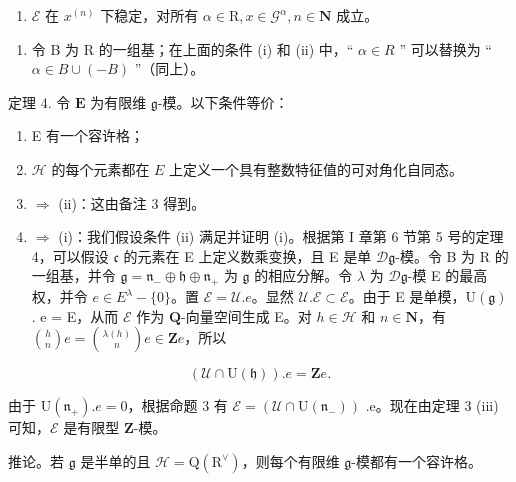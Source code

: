 \begin{enumerate}
\def\labelenumi{(\roman{enumi})}
\setcounter{enumi}{2}
\tightlist
\item
  \(\mathcal{E}\) 在 \(x^{(n)}\) 下稳定，对所有 \(\alpha \in \mathrm{R}, x \in \mathcal{G}^{\alpha}, n \in \mathbf{N}\) 成立。
\end{enumerate}

\begin{enumerate}
\def\labelenumi{\arabic{enumi})}
\setcounter{enumi}{4}
\tightlist
\item
  令 B 为 R 的一组基；在上面的条件 (i) 和 (ii) 中，`` \(\alpha \in R\) '' 可以替换为 `` \(\alpha \in B \cup (-B)\) ''（同上）。
\end{enumerate}

定理 4. 令 \(\mathbf{E}\) 为有限维 \(\mathfrak{g}\)-模。以下条件等价：

\begin{enumerate}
\def\labelenumi{(\roman{enumi})}
\item
  E 有一个容许格；
\item
  \(\mathcal{H}\) 的每个元素都在 \(E\) 上定义一个具有整数特征值的可对角化自同态。
\item
  \(\Longrightarrow\) (ii)：这由备注 3 得到。
\item
  \(\Longrightarrow\) (i)：我们假设条件 (ii) 满足并证明 (i)。根据第 I 章第 6 节第 5 号的定理 4，可以假设 \(\mathfrak{c}\) 的元素在 E 上定义数乘变换，且 E 是单 \(\mathcal{D}\mathfrak{g}\)-模。令 B 为 \(\mathrm{R}\) 的一组基，并令 \(\mathfrak{g} = \mathfrak{n}_{-} \oplus \mathfrak{h} \oplus \mathfrak{n}_{+}\) 为 \(\mathfrak{g}\) 的相应分解。令 \(\lambda\) 为 \(\mathcal{D}\mathfrak{g}\)-模 E 的最高权，并令 \(e \in E^{\lambda} - \{0\}\)。置 \(\mathcal{E} = \mathcal{U}.e\)。显然 \(\mathcal{U}.\mathcal{E} \subset \mathcal{E}\)。由于 E 是单模，\(\mathrm{U}(\mathfrak{g})\) . e = E，从而 \(\mathcal{E}\) 作为 \(\mathbf{Q}\)-向量空间生成 E。对 \(h \in \mathcal{H}\) 和 \(n \in \mathbf{N}\)，有 \(\binom{h}{n} e = \binom{\lambda(h)}{n} e \in \mathbf{Z} e\)，所以
\end{enumerate}

\[
(\mathcal {U} \cap \mathrm{U} (\mathfrak {h})). e = \mathbf {Z}   e.
\]

由于 \(\mathrm{U}(\mathfrak{n}_{+}).e=0\)，根据命题 3 有 \(\mathcal{E}=(\mathcal{U}\cap\mathrm{U}(\mathfrak{n}_{-}))\) .e。现在由定理 3 (iii) 可知，\(\mathcal{E}\) 是有限型 \(\mathbf{Z}\)-模。

推论。若 \(\mathfrak{g}\) 是半单的且 \(\mathcal{H}=\mathrm{Q}(\mathrm{R}^{\vee})\)，则每个有限维 \(\mathfrak{g}\)-模都有一个容许格。

